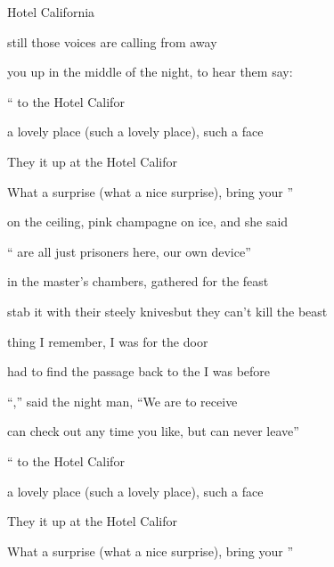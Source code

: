 \begin{SBSong}{Hotel California}
\begin{SBVerse}
     still those voices are calling from  away

     you up in the middle of the night,  to hear them say:
  \end{SBVerse}
  \CBPageBrk
  \begin{SBChorus}
    `` to the Hotel Califor

     a lovely place (such a lovely place), such a  face

    They  it up at the Hotel Califor

    What a  surprise (what a nice surprise), bring your ''
  \end{SBChorus}
  \WBPageBrk
  \begin{SBVerse}
     on the ceiling,  pink champagne on ice, and she said

    `` are all just prisoners here,  our own device''

     in the master's chambers,  gathered for the feast

     stab it with their steely knives\WBLineBrk but they  can't kill the beast

     thing I remember, I was  for the door

     had to find the passage back to the  I was before

    ``,'' said the night man, ``We are  to receive

     can check out any time you like, but  can never leave''
  \end{SBVerse}
    \begin{SBChorus}
    `` to the Hotel Califor

     a lovely place (such a lovely place), such a  face

    They  it up at the Hotel Califor

    What a  surprise (what a nice surprise), bring your ''  
  \end{SBChorus}
\end{SBSong}
